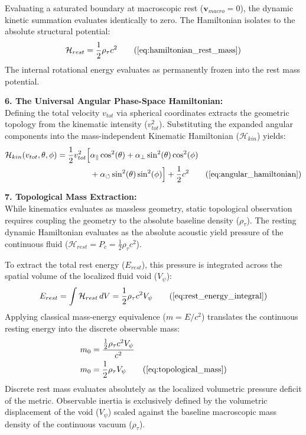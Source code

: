 \documentclass[11pt, a4paper]{article}
\begin{document}
Evaluating a saturated boundary at macroscopic rest ($\mathbf{v}_{macro} = 0$), the dynamic kinetic summation evaluates identically to zero. The Hamiltonian isolates   to the absolute structural potential:
\begin{equation}
    \mathcal{H}_{rest} = \frac{1}{2} \rho_{\tau} c^2 \tag{\ref{eq:hamiltonian_rest_mass}}
\end{equation}
The internal rotational energy evaluates as permanently frozen into the rest mass potential. 

\textbf{6. The Universal Angular Phase-Space Hamiltonian:} \\
Defining the total velocity $v_{tot}$ via spherical coordinates extracts the geometric topology from the kinematic intensity ($v_{tot}^2$). Substituting the expanded angular components into the mass-independent Kinematic Hamiltonian ($\mathcal{H}_{kin}$) yields:
\begin{align}
    \mathcal{H}_{kin}(v_{tot}, \theta, \phi) = \frac{1}{2} v_{tot}^2 \Big[ &\alpha_{\parallel} \cos^2(\theta) + \alpha_{\perp} \sin^2(\theta)\cos^2(\phi) \nonumber \\
    &+ \alpha_{\circlearrowleft} \sin^2(\theta)\sin^2(\phi) \Big] + \frac{1}{2} c^2 \tag{\ref{eq:angular_hamiltonian}}
\end{align}

\textbf{7. Topological Mass Extraction:} \\
While kinematics evaluates as massless geometry, static topological observation requires coupling the geometry to the absolute baseline density ($\rho_{\tau}$). The resting dynamic Hamiltonian evaluates   as the absolute acoustic yield pressure of the continuous fluid ($\mathcal{H}_{rest} = P_c = \frac{1}{2}\rho_{\tau} c^2$). 

To extract the total rest energy ($E_{rest}$), this pressure is integrated across the spatial volume of the localized fluid void ($V_{\psi}$):
\begin{equation}
    E_{rest} = \int \mathcal{H}_{rest} \, dV = \frac{1}{2} \rho_{\tau} c^2 V_{\psi} \tag{\ref{eq:rest_energy_integral}}
\end{equation}
Applying classical mass-energy equivalence ($m = E/c^2$) translates the continuous resting energy into the discrete observable mass:
\begin{align}
    m_0 &= \frac{\frac{1}{2} \rho_{\tau} c^2 V_{\psi}}{c^2} \nonumber \\
    m_0 &= \frac{1}{2} \rho_{\tau} V_{\psi} \tag{\ref{eq:topological_mass}}
\end{align}
Discrete rest mass evaluates absolutely as the localized volumetric pressure deficit of the metric. Observable inertia is exclusively defined by the volumetric displacement of the void ($V_{\psi}$) scaled against the baseline macroscopic mass density of the continuous vacuum ($\rho_{\tau}$).
\end{document}
